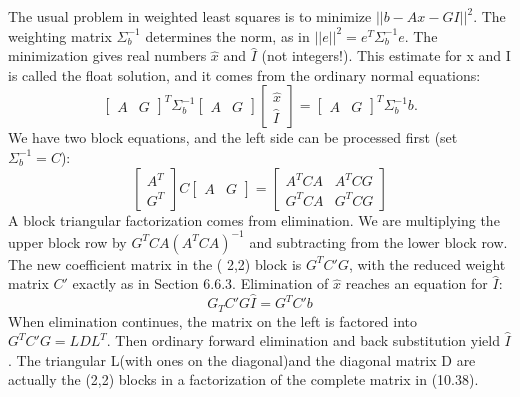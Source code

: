 The usual problem in weighted least squares is to minimize $||b-Ax-GI||^{2}$. The weighting matrix $\Sigma_{b}^{-1}$ determines the norm, as in $||e||^{2}=e^{T}\Sigma_{b}^{-1}e$. The minimization gives real numbers $\hat{x}$ and $\hat{I}$ (not integers!). This estimate for x and I is called the float solution, and it comes from the ordinary normal equations:
\begin{equation}
\begin{bmatrix}
A & G
\end{bmatrix}^{T}
\Sigma_{b}^{-1}
\begin{bmatrix}
A & G
\end{bmatrix}
\begin{bmatrix}\hat{x}\\\hat{I}
\end{bmatrix}
=
\begin{bmatrix}
A & G
\end{bmatrix}^{T}
\Sigma_{b}^{-1}b.
\end{equation}
We have two block equations, and the left side can be processed first (set $\Sigma_{b}^{-1}=C$):
\begin{equation}
\begin{bmatrix}
A^{T}\\G^{T}
\end{bmatrix}C
\begin{bmatrix}
A&G
\end{bmatrix}
=
\begin{bmatrix}
A^{T}CA & A^{T}CG\\
G^{T}CA & G^{T}CG
\end{bmatrix}
\end{equation}
A block triangular factorization comes from elimination. We are multiplying the upper block row by $G^{T}CA(A^{T}CA)^{-1}$ and subtracting from the lower block row. The new coefficient matrix in the ( 2,2) block is $G^{T}C'G$, with the reduced weight matrix $C'$ exactly as in Section 6.6.3. Elimination of $\hat{x}$ reaches an equation for $\hat{I}$:
\begin{equation}
G_{T}C'G\hat{I}=G^{T}C'b
\end{equation}
When elimination continues, the matrix on the left is factored into $G^{T}C'G=LDL^{T}$. Then ordinary forward elimination and back substitution yield $\hat{I}$. The triangular L(with ones on the diagonal)and the diagonal matrix D are actually the (2,2) blocks in a factorization of the complete matrix in (10.38).

